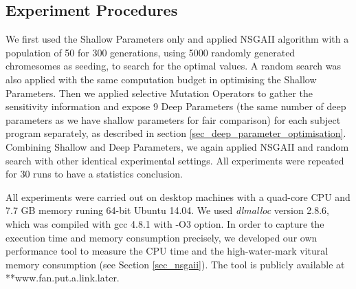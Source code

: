 \subsection{Experiment Procedures}

We first used the Shallow Parameters only and applied NSGAII algorithm with a population of 50 for 300 generations, using 5000 randomly generated chromesomes as seeding, to search for the optimal values. A random search was also applied with the same computation budget in optimising the Shallow Parameters. Then we applied selective Mutation Operators to gather the sensitivity information and expose 9 Deep Parameters (the same number of deep parameters as we have shallow parameters for fair comparison) for each subject program separately, as described in section \ref{sec_deep_parameter_optimisation}. Combining Shallow and Deep Parameters, we again applied NSGAII and random search with other identical experimental settings. All experiments were repeated for 30 runs to have a statistics conclusion.

All experiments were carried out on desktop machines with a quad-core CPU and 7.7 GB memory runing 64-bit Ubuntu 14.04. We used \emph{dlmalloc} version 2.8.6, which was compiled with gcc 4.8.1 with -O3 option. In order to capture the execution time and memory consumption precisely, we developed our own performance tool to measure the CPU time and the high-water-mark vitural memory consumption (see Section \ref{sec_nsgaii}). The tool is publicly available at **www.fan.put.a.link.later.
\\
\\
\\
